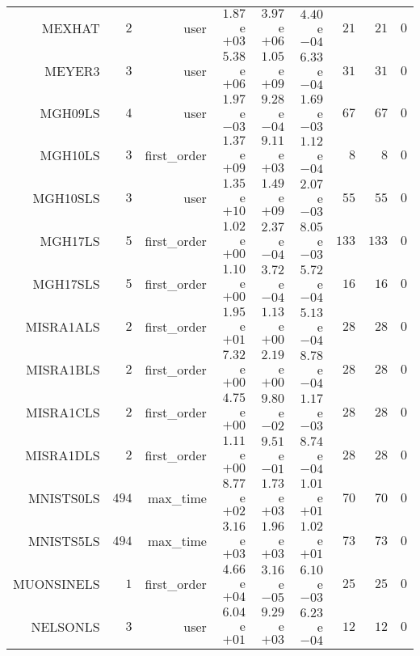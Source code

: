 \begin{longtable}{rrrrrrrrr}
MEXHAT & \(     2\) & user & \( 1.87\)e\(+03\) & \( 3.97\)e\(+06\) & \( 4.40\)e\(-04\) & \(    21\) & \(    21\) & \(     0\) \\
MEYER3 & \(     3\) & user & \( 5.38\)e\(+06\) & \( 1.05\)e\(+09\) & \( 6.33\)e\(-04\) & \(    31\) & \(    31\) & \(     0\) \\
MGH09LS & \(     4\) & user & \( 1.97\)e\(-03\) & \( 9.28\)e\(-04\) & \( 1.69\)e\(-03\) & \(    67\) & \(    67\) & \(     0\) \\
MGH10LS & \(     3\) & first\_order & \( 1.37\)e\(+09\) & \( 9.11\)e\(+03\) & \( 1.12\)e\(-04\) & \(     8\) & \(     8\) & \(     0\) \\
MGH10SLS & \(     3\) & user & \( 1.35\)e\(+10\) & \( 1.49\)e\(+09\) & \( 2.07\)e\(-03\) & \(    55\) & \(    55\) & \(     0\) \\
MGH17LS & \(     5\) & first\_order & \( 1.02\)e\(+00\) & \( 2.37\)e\(-04\) & \( 8.05\)e\(-03\) & \(   133\) & \(   133\) & \(     0\) \\
MGH17SLS & \(     5\) & first\_order & \( 1.10\)e\(+00\) & \( 3.72\)e\(-04\) & \( 5.72\)e\(-04\) & \(    16\) & \(    16\) & \(     0\) \\
MISRA1ALS & \(     2\) & first\_order & \( 1.95\)e\(+01\) & \( 1.13\)e\(+00\) & \( 5.13\)e\(-04\) & \(    28\) & \(    28\) & \(     0\) \\
MISRA1BLS & \(     2\) & first\_order & \( 7.32\)e\(+00\) & \( 2.19\)e\(+00\) & \( 8.78\)e\(-04\) & \(    28\) & \(    28\) & \(     0\) \\
MISRA1CLS & \(     2\) & first\_order & \( 4.75\)e\(+00\) & \( 9.80\)e\(-02\) & \( 1.17\)e\(-03\) & \(    28\) & \(    28\) & \(     0\) \\
MISRA1DLS & \(     2\) & first\_order & \( 1.11\)e\(+00\) & \( 9.51\)e\(-01\) & \( 8.74\)e\(-04\) & \(    28\) & \(    28\) & \(     0\) \\
MNISTS0LS & \(   494\) & max\_time & \( 8.77\)e\(+02\) & \( 1.73\)e\(+03\) & \( 1.01\)e\(+01\) & \(    70\) & \(    70\) & \(     0\) \\
MNISTS5LS & \(   494\) & max\_time & \( 3.16\)e\(+03\) & \( 1.96\)e\(+03\) & \( 1.02\)e\(+01\) & \(    73\) & \(    73\) & \(     0\) \\
MUONSINELS & \(     1\) & first\_order & \( 4.66\)e\(+04\) & \( 3.16\)e\(-05\) & \( 6.10\)e\(-03\) & \(    25\) & \(    25\) & \(     0\) \\
NELSONLS & \(     3\) & user & \( 6.04\)e\(+01\) & \( 9.29\)e\(+03\) & \( 6.23\)e\(-04\) & \(    12\) & \(    12\) & \(     0\) \\

\end{longtable}
